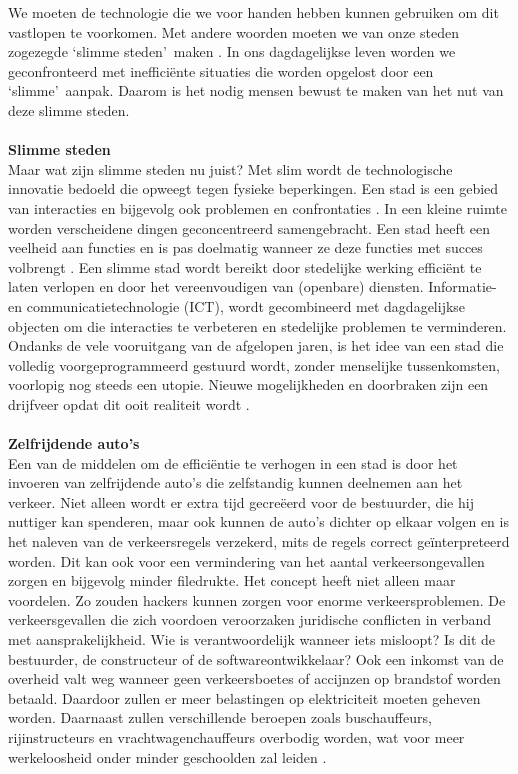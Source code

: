 \documentclass[a4paper,kulak]{kulakarticle}
\begin{document}
We moeten de technologie die we voor handen hebben kunnen gebruiken om dit vastlopen te voorkomen. Met andere woorden moeten we van onze steden zogezegde  \lq slimme steden\rq\  maken \cite{taaladvies}. In ons dagdagelijkse leven worden we geconfronteerd met inefficiënte situaties die worden opgelost door een \lq slimme\rq\ aanpak. Daarom is het nodig mensen bewust te maken van het nut van deze slimme steden.\\ \\
\textbf{\large Slimme steden} \\
Maar wat zijn slimme steden nu juist? Met slim wordt de technologische innovatie bedoeld die opweegt tegen fysieke beperkingen. Een stad is een gebied van interacties en bijgevolg ook problemen en confrontaties \cite{sc}. In een kleine ruimte worden verscheidene dingen geconcentreerd samengebracht. Een stad heeft een veelheid aan functies en is pas doelmatig  wanneer ze deze functies met succes volbrengt \cite{synoniemen}. Een slimme stad wordt bereikt door stedelijke werking efficiënt te laten verlopen en door het vereenvoudigen van (openbare) diensten. Informatie- en communicatietechnologie (ICT), wordt gecombineerd met dagdagelijkse objecten om die interacties te verbeteren en stedelijke problemen te verminderen. Ondanks de vele vooruitgang van de afgelopen jaren, is het idee van een stad die volledig voorgeprogrammeerd gestuurd wordt, zonder menselijke tussenkomsten, voorlopig nog steeds een utopie. Nieuwe mogelijkheden en doorbraken zijn een drijfveer opdat dit ooit realiteit wordt \cite{proconsc}.\\ \\
\textbf{\large Zelfrijdende auto's} \\
Een van de middelen om de efficiëntie te verhogen in een stad is door het invoeren van zelfrijdende auto's die zelfstandig kunnen deelnemen aan het verkeer. Niet alleen wordt er extra tijd gecreëerd voor de bestuurder, die hij nuttiger kan spenderen, maar ook kunnen de auto's dichter op elkaar volgen en is het naleven van de verkeersregels verzekerd, mits de regels correct geïnterpreteerd worden. Dit kan ook voor een vermindering van het aantal verkeersongevallen zorgen en bijgevolg minder filedrukte. Het concept heeft niet alleen maar voordelen. Zo zouden hackers kunnen zorgen voor enorme verkeersproblemen. De verkeersgevallen die zich voordoen veroorzaken juridische conflicten in verband met aansprakelijkheid. Wie is verantwoordelijk wanneer iets misloopt? Is dit de bestuurder, de constructeur of de softwareontwikkelaar? Ook een inkomst van de overheid valt weg wanneer geen verkeersboetes of accijnzen op brandstof worden betaald. Daardoor zullen er meer belastingen op elektriciteit moeten geheven worden. Daarnaast zullen verschillende beroepen zoals buschauffeurs, rijinstructeurs en vrachtwagenchauffeurs overbodig worden, wat voor meer werkeloosheid onder minder geschoolden zal leiden \cite{procontracars}.
\end{document}
